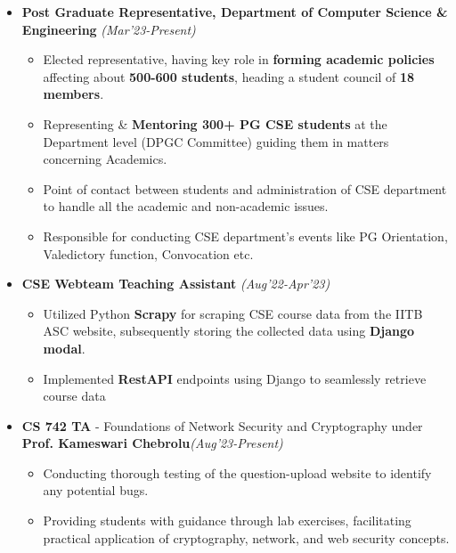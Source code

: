 \documentclass[a4paper,10pt]{article}
\newcommand{\isep}{-2 pt}
\begin{document}
\begin{itemize}[noitemsep,nolistsep]

\item \textbf{Post Graduate Representative, Department of Computer Science \& Engineering}  \emph{\hfill(Mar’23-Present)}  \\[-0.4cm]
	\begin{itemize}[noitemsep]
	\item Elected representative, having key role in \textbf{forming academic policies} affecting about \textbf{500-600 students}, heading a student council of \textbf{18 members}.
    \item Representing \& \textbf{Mentoring 300+ PG CSE students} at the Department level (DPGC Committee) guiding them in matters concerning Academics.
 \item Point of contact between students and administration of CSE department to handle all the academic and non-academic issues.
 \item Responsible for conducting CSE department's events like PG Orientation, Valedictory function, Convocation etc.
    \\[-0.4cm]
	\end{itemize}

\item \textbf{CSE Webteam Teaching Assistant}  \emph{\hfill(Aug’22-Apr'23)}  \\[-0.4cm]
	\begin{itemize}\itemsep \isep
	\item Utilized Python \textbf{Scrapy} for scraping CSE course data from the IITB ASC website, subsequently storing the collected data using \textbf{Django modal}.
 \item Implemented \textbf{RestAPI} endpoints using Django to seamlessly retrieve course data
    \\[-0.4cm]
	\end{itemize}

 \item \textbf{CS 742 TA} - Foundations of Network Security and Cryptography
 under \textbf{Prof. Kameswari Chebrolu}\emph{\hfill(Aug’23-Present)}  
	\begin{itemize}\itemsep \isep
 \item Conducting thorough testing of the question-upload website to identify any potential bugs.
 \item Providing students with guidance through lab exercises, facilitating practical application of cryptography, network, and web security concepts.
\end{itemize}
\end{itemize}
\end{document}
